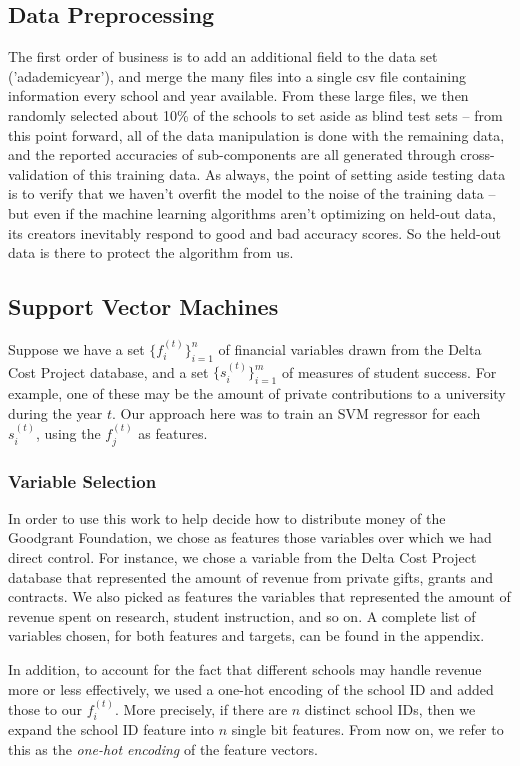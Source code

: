 \documentclass[paper.tex]{subfiles}
\begin{document}
\subsection{Data Preprocessing}
The first order of business is to add an additional field to the data set ('adademicyear'), and merge the many files into a single csv file containing information every school and year available. From these large files, we then randomly selected about 10\% of the schools to set aside as blind test sets -- from this point forward, all of the data manipulation is done with the remaining data, and the reported accuracies of sub-components are all generated through cross-validation of this training data. As always, the point of setting aside testing data is to verify that we haven't overfit the model to the noise of the training data -- but even if the machine learning algorithms aren't optimizing on held-out data, its creators inevitably respond to good and bad accuracy scores. So the held-out data is there to protect the algorithm from us. 


\subsection{Support Vector Machines} 
Suppose we have a set $\{ f_i^{(t)} \}_{i = 1}^n$ of financial variables drawn from the Delta Cost Project database, and a set $\{ s_i^{(t)} \}_{i = 1}^m$ of measures of student success. For example, one of these may be the amount of private contributions to a university during the year $t$. Our approach here was to train an SVM regressor for each $s_i^{(t)}$, using the $f_j^{(t)}$ as features. 
\subsubsection{Variable Selection} 
In order to use this work to help decide how to distribute money of the Goodgrant Foundation, we chose as features those variables over which we had direct control. For instance, we chose a variable from the Delta Cost Project database that represented the amount of revenue from private gifts, grants and contracts. We also picked as features the variables that represented the amount of revenue spent on research, student instruction, and so on. A complete list of variables chosen, for both features and targets, can be found in the appendix.  

In addition, to account for the fact that different schools may handle revenue more or less effectively, we used a one-hot encoding of the school ID and added those to our $f_i^{(t)}$. More precisely, if there are $n$ distinct school IDs, then we expand the school ID feature into $n$ single bit features. From now on, we refer to this as the \emph{one-hot encoding} of the feature vectors. 
\end{document}
